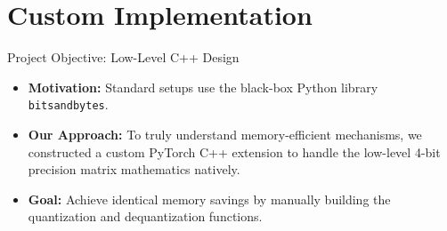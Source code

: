 \documentclass[aspectratio=169]{beamer}
\begin{document}
\section{Custom Implementation}

\begin{frame}{Project Objective: Low-Level C++ Design}
    \begin{itemize}
        \item \textbf{Motivation:} Standard setups use the black-box Python library \texttt{bitsandbytes}.
        \item \textbf{Our Approach:} To truly understand memory-efficient mechanisms, we constructed a custom PyTorch C++ extension to handle the low-level 4-bit precision matrix mathematics natively.
        \item \textbf{Goal:} Achieve identical memory savings by manually building the quantization and dequantization functions.
    \end{itemize}
\end{frame}
\end{document}
